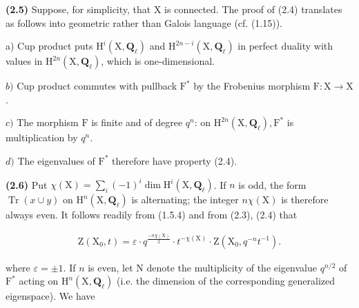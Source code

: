 \documentclass[10pt,leqno]{article}
\begin{document}
\noindent \textbf{(2.5)} Suppose, for simplicity, that \(\mathrm{X}\) is connected. The proof of (2.4) translates as follows into geometric rather than Galois language (cf. (1.15)).\par

\noindent a) Cup product puts \(\mathrm{H}^{i}(\mathrm{X},\mathbf{Q}_{\ell })\) and \(\mathrm{H}^{2n- i}(\mathrm{X},\mathbf{Q}_{\ell })\) in perfect duality with values in \(\mathrm{H}^{2n}(\mathrm{X},\mathbf{Q}_{\ell })\), which is one-dimensional.\par

\noindent \(b)\) Cup product commutes with pullback \(\mathrm{F}^{*}\) by the Frobenius morphism \(\mathrm{F}:\mathrm{X}\longrightarrow \mathrm{X}\).\par

\noindent \(c)\) The morphism \(\mathrm{F}\) is finite and of degree \(q^{n}\): on \(\mathrm{H}^{2n}(\mathrm{X},\mathbf{Q}_{\ell }), \mathrm{F}^{*}\) is multiplication by \(q^{n}\).\par

\noindent \(d)\) The eigenvalues of \(\mathrm{F}^{*}\) therefore have property (2.4).\par

\noindent \textbf{(2.6)} Put \(\chi (\mathrm{X})=\sum _{i}(- 1)^{i} \operatorname{dim} \mathrm{H}^{i}(\mathrm{X},\mathbf{Q}_{\ell })\). If \(n\) is odd, the form \(\operatorname{Tr}(x\cup y)\) on \(\mathrm{H}^{n}(\mathrm{X},\mathbf{Q}_{\ell })\) is alternating; the integer \(n\chi (\mathrm{X})\) is therefore always even. It follows readily from (1.5.4) and from (2.3), (2.4) that\par

\begin{equation*}\begin{gathered}\mathrm{Z}(\mathrm{X}_{0},t) = \varepsilon \cdot q^{\frac{-n\chi(\mathrm{X})}{2}}\cdot t^{- \chi (\mathrm{X})}\cdot \mathrm{Z}(\mathrm{X}_{0},q^{- n}t^{- 1}).\end{gathered}\end{equation*}

\clearpage

\label{physical-11}\par\smallskip

\noindent where \(\varepsilon =\pm 1\). If \(n\) is even, let \(\mathrm{N}\) denote the multiplicity of the eigenvalue \(q^{n/2}\) of \(\mathrm{F}^{*}\) acting on \(\mathrm{H}^{n}(\mathrm{X},\mathbf{Q}_{\ell })\) (i.e. the dimension of the corresponding generalized eigenspace). We have\par
\end{document}
